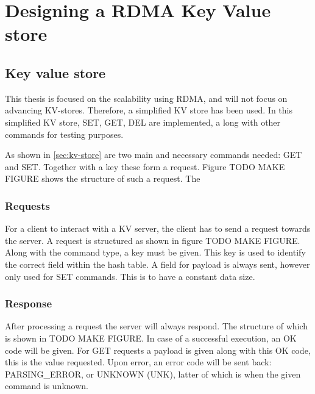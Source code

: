 
\chapter{Designing a RDMA Key Value store}\label{ch:design} %



\ifpdf
    \graphicspath{{7/figures/PNG/}{7/figures/PDF/}{7/figures/}}
\else
    \graphicspath{{7/figures/EPS/}{7/figures/}}
\fi



\section{Key value store}
This thesis is focused on the scalability using RDMA, and will not focus on advancing KV-stores.
Therefore, a simplified KV store has been used.
In this simplified KV store, SET, GET, DEL are implemented, a long with other commands for testing purposes.


As shown in \ref{sec:kv-store} are two main and necessary commands needed: GET and SET.
Together with a key these form a request.
Figure TODO MAKE FIGURE shows the structure of such a request.
The
\subsection{Requests}
For a client to interact with a KV server, the client has to send a request towards the server.
A request is structured as shown in figure TODO MAKE FIGURE.
Along with the command type, a key must be given.
This key is used to identify the correct field within the hash table.
A field for payload is always sent, however only used for SET commands.
This is to have a constant data size.

\subsection{Response}
After processing a request the server will always respond.
The structure of which is shown in TODO MAKE FIGURE.
In case of a successful execution, an OK code will be given.
For GET requests a payload is given along with this OK code, this is the value requested.
Upon error, an error code will be sent back: PARSING\_ERROR, or UNKNOWN (UNK), latter of which is when the given command is unknown.


